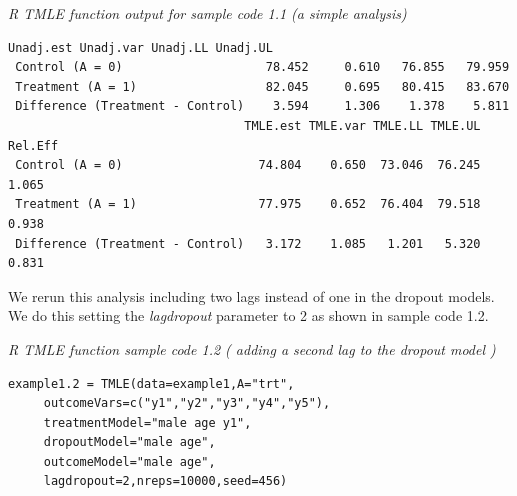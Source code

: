 \documentclass[10pt]{article}
\renewcommand{\baselinestretch}{1.3}
\begin{document}
\begin{minipage}{\textwidth}
\renewcommand{\baselinestretch}{1.0}\selectfont%
\begin{minipage}[l]{5.6in}
\normalsize\em%
R TMLE function output for sample code 1.1 (a simple analysis) 
\end{minipage}\vspace{-0.08in}
\begin{Verbatim}[baselinestretch=1.0, fontsize=\small, frame=single, commandchars=\\\{\}]
                                 Unadj.est Unadj.var Unadj.LL Unadj.UL
 Control (A = 0)                    78.452     0.610   76.855   79.959
 Treatment (A = 1)                  82.045     0.695   80.415   83.670
 Difference (Treatment - Control)    3.594     1.306    1.378    5.811
                                 TMLE.est TMLE.var TMLE.LL TMLE.UL Rel.Eff
 Control (A = 0)                   74.804    0.650  73.046  76.245   1.065
 Treatment (A = 1)                 77.975    0.652  76.404  79.518   0.938
 Difference (Treatment - Control)   3.172    1.085   1.201   5.320   0.831
\end{Verbatim}
\end{minipage}
\vspace{0.2in}
\newpage
We rerun this analysis including two lags instead of one in the dropout models.  We do this setting the {\em lagdropout} parameter to 2 as shown in sample code 1.2.
\vspace{0.1in}

\begin{minipage}{\textwidth}
\renewcommand{\baselinestretch}{1.0}\selectfont%
\begin{minipage}[l]{5.6in}
\normalsize\em%
R TMLE function sample code 1.2 ( adding a second lag to the dropout model )
\end{minipage}\vspace{-0.08in}
\begin{Verbatim}[baselinestretch=1.0, fontsize=\small, frame=single, commandchars=\\\{\}]
example1.2 = TMLE(data=example1,A="trt",
     outcomeVars=c("y1","y2","y3","y4","y5"),
     treatmentModel="male age y1",
     dropoutModel="male age",
     outcomeModel="male age",
     lagdropout=2,nreps=10000,seed=456)
\end{Verbatim}
\end{minipage}
\vspace{0.2in}
\end{document}
